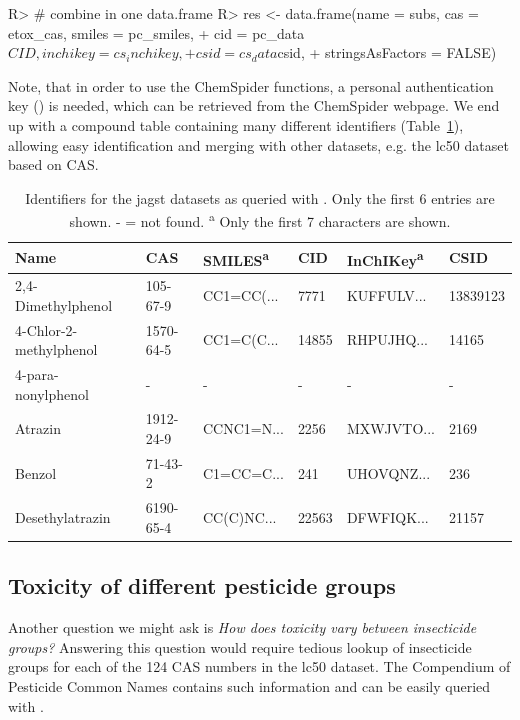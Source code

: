 \documentclass[article, shortnames]{jss}\usepackage[]{graphicx}\usepackage[]{color}
\begin{document}
\begin{CodeChunk}
\begin{CodeInput}
R> # combine in one data.frame
R> res <- data.frame(name = subs, cas = etox_cas, smiles = pc_smiles, 
+                    cid = pc_data$CID, inchikey = cs_inchikey, 
+                    csid = cs_data$csid, 
+                    stringsAsFactors = FALSE)
\end{CodeInput}
\end{CodeChunk}

Note, that in order to use the ChemSpider functions, a personal authentication key () is needed, which can be retrieved from the ChemSpider webpage. 
We end up with a compound table containing many different identifiers (Table~\ref{tab:comptable}), allowing easy identification and merging with other datasets, e.g. the lc50 dataset based on CAS.

\begin{table}[ht]
\centering
\begin{CodeChunk}
\begin{tabular}{llllll}
  \toprule
Name & CAS & SMILES\textsuperscript{a} & CID & InChIKey\textsuperscript{a} & CSID \\ 
  \midrule
2,4-Dimethylphenol & 105-67-9 & CC1=CC(... & 7771 & KUFFULV... & 13839123 \\ 
  4-Chlor-2-methylphenol & 1570-64-5 & CC1=C(C... & 14855 & RHPUJHQ... & 14165 \\ 
  4-para-nonylphenol & - & - & - & - & - \\ 
  Atrazin & 1912-24-9 & CCNC1=N... & 2256 & MXWJVTO... & 2169 \\ 
  Benzol & 71-43-2 & C1=CC=C... & 241 & UHOVQNZ... & 236 \\ 
  Desethylatrazin & 6190-65-4 & CC(C)NC... & 22563 & DFWFIQK... & 21157 \\ 
   \bottomrule
\end{tabular}
\end{CodeChunk}
\caption{Identifiers for the jagst datasets as queried with . Only the first 6 entries are shown. - = not found. \textsuperscript{a} Only the first 7 characters are shown.}
\label{tab:comptable}
\end{table}


\subsection[Toxicity of different pesticide groups]{Toxicity of different pesticide groups}
Another question we might ask is \emph{How does toxicity vary between insecticide groups?}
Answering this question would require tedious lookup of insecticide groups for each of the 124 CAS numbers in the lc50 dataset.
The Compendium of Pesticide Common Names \citep{wood} contains such information and can be easily queried with .
\end{document}
